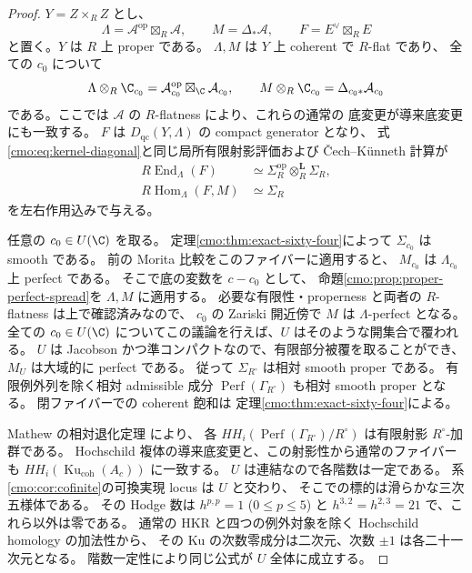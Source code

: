 \begin{proof}
$Y=Z\times_R Z$ とし、
\[
 \Lambda=\mathcal A^{\mathrm{op}}\boxtimes_R\mathcal A,
 \qquad M=\Delta_*\mathcal A,\qquad
 F=E^\vee\boxtimes_R E
\]
と置く。$Y$ は $R$ 上 proper である。
$\Lambda,M$ は $Y$ 上 coherent で $R$-flat であり、
全ての $c_0$ について
\[
 \Lambda\otimes_R\C_{c_0}
   =\mathcal A_{c_0}^{\mathrm{op}}\boxtimes_\C\mathcal A_{c_0},
 \qquad
 M\otimes_R\C_{c_0}=\Delta_{c_0*}\mathcal A_{c_0}
\]
である。ここでは $\mathcal A$ の $R$-flatness により、これらの通常の
底変更が導来底変更にも一致する。
$F$ は $D_{\mathrm{qc}}(Y,\Lambda)$ の compact generator となり、
式\eqref{cmo:eq:kernel-diagonal}と同じ局所有限射影評価および
\v Cech--K\"unneth 計算が
\[
 \begin{aligned}
 R\operatorname{End}_\Lambda(F)
 &\simeq\Sigma_R^{\mathrm{op}}\otimes_R^{\mathbf L}\Sigma_R,\\
 R\operatorname{Hom}_\Lambda(F,M)&\simeq\Sigma_R
 \end{aligned}
\]
を左右作用込みで与える。

任意の $c_0\in U(\C)$ を取る。
定理\ref{cmo:thm:exact-sixty-four}によって $\Sigma_{c_0}$ は smooth である。
前の Morita 比較をこのファイバーに適用すると、
$M_{c_0}$ は $\Lambda_{c_0}$ 上 perfect である。
そこで底の変数を $c-c_0$ として、
命題\ref{cmo:prop:proper-perfect-spread}を $\Lambda,M$ に適用する。
必要な有限性・properness と両者の $R$-flatness は上で確認済みなので、
$c_0$ の Zariski 開近傍で $M$ は $\Lambda$-perfect となる。
全ての $c_0\in U(\C)$ についてこの議論を行えば、$U$ はそのような開集合で覆われる。
$U$ は Jacobson かつ準コンパクトなので、有限部分被覆を取ることができ、
$M_U$ は大域的に perfect である。
従って $\Sigma_{R^\circ}$ は相対 smooth proper である。
有限例外列を除く相対 admissible 成分 $\operatorname{Perf}(\Gamma_{R^\circ})$
も相対 smooth proper となる。
閉ファイバーでの coherent 飽和は
定理\ref{cmo:thm:exact-sixty-four}による。

Mathew の相対退化定理 \cite[Theorem~1.3]{CMOMathewDegeneration}により、
各 $HH_i(\operatorname{Perf}(\Gamma_{R^\circ})/R^\circ)$ は有限射影 $R^\circ$-加群である。
Hochschild 複体の導来底変更と、この射影性から通常のファイバーも
$HH_i(\operatorname{Ku}_{\mathrm{coh}}(A_c))$ に一致する。
$U$ は連結なので各階数は一定である。
系\ref{cmo:cor:cofinite}の可換実現 locus は $U$ と交わり、
そこでの標的は滑らかな三次五様体である。
その Hodge 数は $h^{p,p}=1$ ($0\le p\le5$) と
$h^{3,2}=h^{2,3}=21$ で、これら以外は零である。
通常の HKR と四つの例外対象を除く Hochschild homology の加法性から、
その Ku の次数零成分は二次元、次数 $\pm1$ は各二十一次元となる。
階数一定性により同じ公式が $U$ 全体に成立する。
\end{proof}

